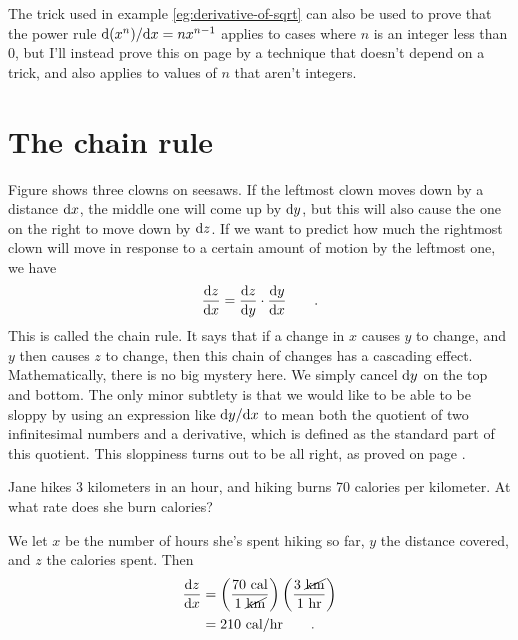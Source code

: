 The trick used in example \ref{eg:derivative-of-sqrt} can also be used to prove that the power
rule $\textup{d}(x^n)/\textup{d} x=nx^{n-1}$ applies to cases where $n$ is an integer less than 0, but
I'll instead prove this on page \pageref{eg:der-x-to-any-k} by a technique that doesn't depend on
a trick, and also applies to values of $n$ that aren't integers.\label{coy-der-x-to-neg-k}


\section{The chain rule}\label{sec:chain-rule}

Figure  shows three clowns on seesaws. If the leftmost clown moves down by a distance $\textup{d} x$,
the middle one will come up by $\textup{d} y$, but this will also cause the one on the right to move down by $\textup{d} z$.
If we want to predict how much the rightmost clown will move in response to a certain amount of motion by the
leftmost one, we have
\begin{equation*}
  \frac{\textup{d} z}{\textup{d} x} =   \frac{\textup{d} z}{\textup{d} y}  \cdot \frac{\textup{d} y}{\textup{d} x} \qquad .
\end{equation*}
This is called the chain rule. It says that if a change in $x$ causes $y$ to change, and $y$ then causes $z$ to change,
then this chain of changes has a cascading effect. Mathematically, 
there is no big mystery here. We simply cancel $\textup{d} y$ on the top and bottom. The only minor subtlety
is that we would like to be able to be sloppy by using an expression like $\textup{d} y/\textup{d} x$ to mean
both the quotient of two infinitesimal numbers and a derivative, which is defined as the standard part
of this quotient. This sloppiness turns out to be all right, as proved on page \pageref{detour:chain-rule}.

\begin{eg}
\egquestion Jane hikes 3 kilometers in an hour, and hiking burns 70 calories per kilometer. At what rate
does she burn calories?

\eganswer We let $x$ be the number of hours she's spent hiking so far, $y$ the distance covered,
and $z$ the calories spent. Then
\begin{align*}
  \frac{\der z}{\der x} &= \left(\frac{70\ \zu{cal}}{1\ \cancel{\zu{km}}}\right)
                                     \left(\frac{3\ \cancel{\zu{km}}}{1\ \zu{hr}}\right) \\
          &= 210\ \zu{cal}/\zu{hr} \qquad .
\end{align*}
\end{eg}

